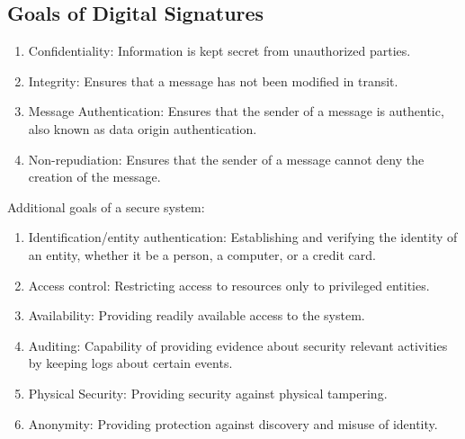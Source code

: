 \documentclass{math}
\begin{document}
\subsection*{Goals of Digital Signatures}
\begin{enumerate}
  \item Confidentiality: Information is kept secret from unauthorized parties.
  \item Integrity: Ensures that a message has not been modified in transit.
  \item Message Authentication: Ensures that the sender of a message is
  authentic, also known as data origin authentication.
  \item Non-repudiation: Ensures that the sender of a message cannot deny the
  creation of the message.
\end{enumerate}
Additional goals of a secure system:
\begin{enumerate}
  \item Identification/entity authentication: Establishing and verifying the
  identity of an entity, whether it be a person, a computer, or a credit card.
  \item Access control: Restricting access to resources only to privileged
  entities.
  \item Availability: Providing readily available access to the system.
  \item Auditing: Capability of providing evidence about security relevant
  activities by keeping logs about certain events.
  \item Physical Security: Providing security against physical tampering.
  \item Anonymity: Providing protection against discovery and misuse of
  identity.
\end{enumerate}
\end{document}
